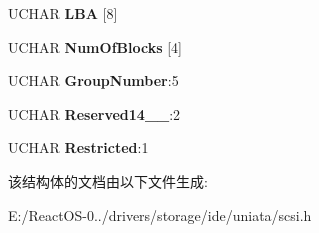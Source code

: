 \begin{DoxyCompactItemize}
\begin{tabbing}
\end{tabbing}\item 
\mbox{\label{struct___c_d_b_1_1___c_d_b16_r_e_a_d_w_r_i_t_e_a75c171aa94486dbc8e8ed74cfd1c28b4}} 
U\+C\+H\+AR {\bfseries L\+BA} \mbox{[}8\mbox{]}
\item 
\mbox{\label{struct___c_d_b_1_1___c_d_b16_r_e_a_d_w_r_i_t_e_a3049847120226f407e9cfaf669f6836c}} 
U\+C\+H\+AR {\bfseries Num\+Of\+Blocks} \mbox{[}4\mbox{]}
\item 
\mbox{\label{struct___c_d_b_1_1___c_d_b16_r_e_a_d_w_r_i_t_e_a777b229b0546359ca827a6cd799c21cb}} 
U\+C\+H\+AR {\bfseries Group\+Number}\+:5
\item 
\mbox{\label{struct___c_d_b_1_1___c_d_b16_r_e_a_d_w_r_i_t_e_a741098fda907186b9cdc2565c2d1117a}} 
U\+C\+H\+AR {\bfseries Reserved14\+\_\+\_}\+:2
\item 
\mbox{\label{struct___c_d_b_1_1___c_d_b16_r_e_a_d_w_r_i_t_e_a093f51d01470b069143162235074db02}} 
U\+C\+H\+AR {\bfseries Restricted}\+:1
\end{DoxyCompactItemize}


该结构体的文档由以下文件生成\+:\begin{DoxyCompactItemize}
\item 
E\+:/\+React\+O\+S-\/0../drivers/storage/ide/uniata/scsi.\+h\end{DoxyCompactItemize}
